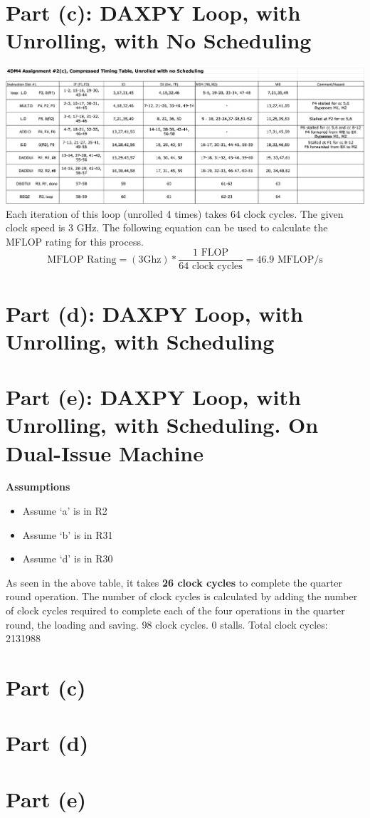 \documentclass[12pt, letterpaper, titlepage, hidelinks]{article}
\begin{document}
\section{Part (c): DAXPY Loop, with Unrolling, with No Scheduling}
	\includegraphics[width=\textwidth]{2c}
	Each iteration of this loop (unrolled 4 times) takes 64 clock cycles. The given clock speed is 3 GHz. The following equation can be used to calculate the MFLOP rating for this process.
	\begin{equation}
		\text{MFLOP Rating} = (3 \text{{Ghz}}) * \frac{1 \text{ FLOP}}{64 \text{ clock cycles}} = 46.9 \text{ MFLOP/s}
	\end{equation}

\section{Part (d): DAXPY Loop, with Unrolling, with Scheduling}

\section{Part (e): DAXPY Loop, with Unrolling, with Scheduling. On  Dual-Issue Machine}
	\textbf{Assumptions}
	\begin{itemize}
		\item Assume `a' is in R2
		\item Assume `b' is in R31
		\item Assume `d' is in R30
	\end{itemize}
	As seen in the above table, it takes \textbf{26 clock cycles} to complete the quarter round operation. The number of clock cycles is calculated by adding the number of clock cycles required to complete each of the four operations in the quarter round, the loading and saving.
		98 clock cycles. 0 stalls.
		Total clock cycles: 2131988
\section{Part (c)}

\section{Part (d)}

\section{Part (e)}
\end{document}
